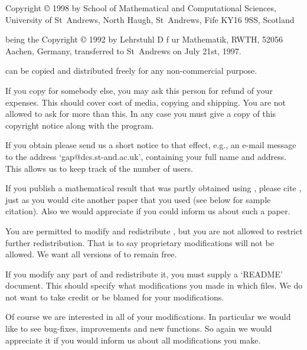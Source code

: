 


Copyright {\copyright} 1998 by
        School of Mathematical and Computational Sciences,
        University of St~Andrews,
        North Haugh, St~Andrews, Fife KY16 9SS, Scotland

being the Copyright {\copyright} 1992 by
        Lehrstuhl D f{ u}r Mathematik, RWTH,
        52056 Aachen, Germany,
transferred to St~Andrews on July 21st, 1997.

\medskip

{\GAP}   can be copied   and  distributed freely  for any  non-commercial
purpose.

If you copy {\GAP} for somebody else, you may ask this person for  refund
of your expenses.  This should cover cost of media, copying and shipping.
You are not allowed to ask for more than this.  In any case you must give
a copy of this copyright notice along with the program.

If you obtain {\GAP} please send us  a short notice to that effect, e.g.,
an  e-mail  message   to  the  address  `gap@dcs.st-and.ac.uk',
containing your full  name and address.  This  allows us to keep track of
the number of {\GAP} users.

If you  publish  a mathematical  result  that  was  partly obtained using
{\GAP}, please cite {\GAP}, just as you would cite another paper that you
used (see below for sample citation). Also   we would appreciate if you
could inform us  about such a paper.

You  are permitted  to modify and  redistribute  {\GAP},  but you are not
allowed  to restrict further redistribution.  That is to say  proprietary
modifications will  not  be allowed.  We want all  versions  of {\GAP} to
remain free.

If you  modify any part of {\GAP} and redistribute it,  you must supply a
`README'  document.   This should specify what modifications you made  in
which  files.  We do  not  want  to take  credit  or  be blamed  for your
modifications.

Of course we are interested in all of your modifications.  In  particular
we would like to see bug-fixes, improvements and new functions.  So again
we would appreciate it if you would inform us about all modifications you
make.

